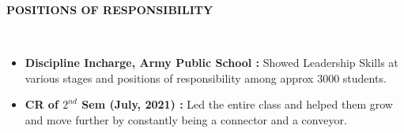 \documentclass[a4paper,10pt]{article}
\newcommand{\lsep}{-0.5cm}
\newcommand{\resheading}[1]{{\small \colorbox{mygrey}{\begin{minipage}{0.975\textwidth}{\textbf{#1 \vphantom{p\^{E}}}}\end{minipage}}}}
\begin{document}
\resheading{\textbf{POSITIONS OF RESPONSIBILITY} }\\[\lsep]
\begin{itemize}
\setlength\itemsep{0em}
\item \noindent \textbf{Discipline Incharge, Army Public School :} Showed Leadership Skills at various stages and positions of responsibility among approx 3000 students.
\item \noindent \textbf{CR of ${2^{nd}}$ Sem (July, 2021) :} Led the entire class and helped them grow and move further by constantly being a connector and a conveyor.

\end{itemize}
\end{document}
